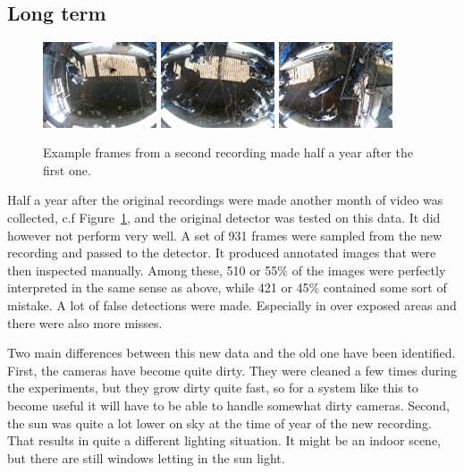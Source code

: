 \documentclass{IET}
\begin{document}
\subsection{Long term}
\begin{figure}[tb]
\begin{center}
  \includegraphics[width=0.3\textwidth]{new-2.jpg}
  \includegraphics[width=0.3\textwidth]{new-1.jpg}
  \includegraphics[width=0.3\textwidth]{new-0.jpg}
\end{center}
  \caption{Example frames from a second recording made half a year after the first one.}
  \label{fig:new}
\end{figure}

Half a year after the original recordings were made another month of video was collected, c.f Figure~\ref{fig:new}, and the original detector was tested on this data. It did however not perform very well. A set of 931 frames were sampled from the new recording and passed to the detector. It produced annotated images that were then inspected manually. Among these, 510 or 55\% of the images were perfectly interpreted in the same sense as above, while 421 or 45\% contained some sort of mistake.
A lot of false detections were made. Especially in over exposed areas and there were also more misses. 

Two main differences between this new data and the old one have been identified. 
First, the cameras have become quite dirty. They were cleaned a few times during the experiments, but they grow dirty quite fast, so for a system like this to become useful it will have to be able to handle somewhat dirty cameras. Second, the sun was quite a lot lower on sky at the time of year of the new recording. That results in quite a different lighting situation. It might be an indoor scene, but there are still windows letting in the sun light.
\end{document}
